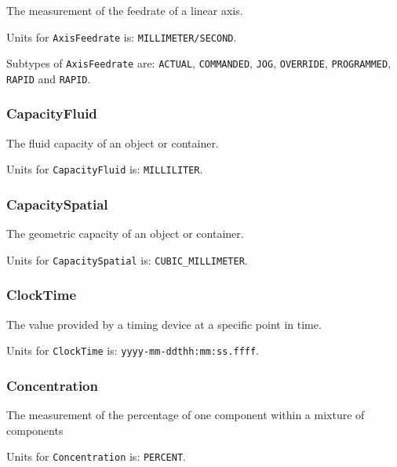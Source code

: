 The measurement of the feedrate of a linear axis.


Units for \texttt{AxisFeedrate} is: \texttt{MILLIMETER/SECOND}.


Subtypes of \texttt{AxisFeedrate} are: \texttt{ACTUAL}, \texttt{COMMANDED}, \texttt{JOG}, \texttt{OVERRIDE}, \texttt{PROGRAMMED}, \texttt{RAPID} and \texttt{RAPID}. 
\FloatBarrier

\subsubsection{CapacityFluid}
  \label{sec:CapacityFluid}



The fluid capacity of an object or container.


Units for \texttt{CapacityFluid} is: \texttt{MILLILITER}.

\FloatBarrier

\subsubsection{CapacitySpatial}
  \label{sec:CapacitySpatial}



The geometric capacity of an object or container.


Units for \texttt{CapacitySpatial} is: \texttt{CUBIC_MILLIMETER}.

\FloatBarrier

\subsubsection{ClockTime}
  \label{sec:ClockTime}



The value provided by a timing device at a specific point in time.


Units for \texttt{ClockTime} is: \texttt{yyyy-mm-ddthh:mm:ss.ffff}.

\FloatBarrier

\subsubsection{Concentration}
  \label{sec:Concentration}



The measurement of the percentage of one component within a mixture of components


Units for \texttt{Concentration} is: \texttt{PERCENT}.

